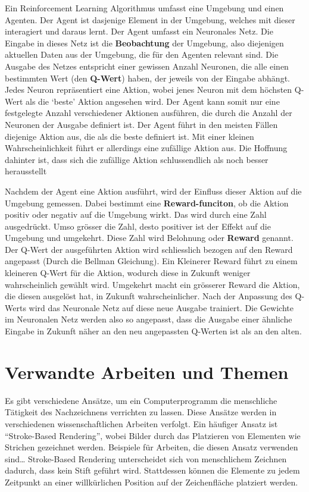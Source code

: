 Ein Reinforcement Learning Algorithmus umfasst eine Umgebung und einen Agenten.
Der Agent ist dasjenige Element in der Umgebung, welches mit dieser interagiert
und daraus lernt. Der Agent umfasst ein Neuronales Netz. Die Eingabe in dieses
Netz ist die \textbf{Beobachtung} der Umgebung, also diejenigen aktuellen Daten
aus der Umgebung, die für den Agenten relevant sind. Die Ausgabe des Netzes
entspricht einer gewissen Anzahl Neuronen, die alle einen bestimmten Wert (den
\textbf{Q-Wert}) haben, der jeweils von der Eingabe abhängt. Jedes Neuron
repräsentiert eine Aktion, wobei jenes Neuron mit dem höchsten Q-Wert als die
`beste' Aktion angesehen wird. Der Agent kann somit nur eine festgelegte Anzahl
verschiedener Aktionen ausführen, die durch die Anzahl der Neuronen der Ausgabe
definiert ist. Der Agent führt in den meisten Fällen diejenige Aktion aus, die
als die beste definiert ist. Mit einer kleinen Wahrscheinlichkeit führt er
allerdings eine zufällige Aktion aus. Die Hoffnung dahinter ist, dass sich die
zufällige Aktion schlussendlich als noch besser herausstellt 

Nachdem der Agent eine Aktion ausführt, wird der Einfluss dieser Aktion auf die
Umgebung gemessen. Dabei bestimmt eine \textbf{Reward-funciton}, ob die Aktion
positiv oder negativ auf die Umgebung wirkt. Das wird durch eine Zahl
ausgedrückt. Umso grösser die Zahl, desto positiver ist der Effekt auf die
Umgebung und umgekehrt. Diese Zahl wird Belohnung oder \textbf{Reward} genannt.
Der Q-Wert der ausgeführten Aktion wird schliesslich bezogen auf den Reward
angepasst (Durch die Bellman Gleichung). Ein Kleinerer Reward führt zu einem
kleineren Q-Wert für die Aktion, wodurch diese in Zukunft weniger wahrscheinlich
gewählt wird. Umgekehrt macht ein grösserer Reward die Aktion, die diesen
ausgelöst hat, in Zukunft wahrscheinlicher. Nach der Anpassung des Q-Werts wird
das Neuronale Netz auf diese neue Ausgabe trainiert. Die Gewichte im Neuronalen
Netz werden also so angepasst, dass die Ausgabe einer ähnliche Eingabe in
Zukunft näher an den neu angepassten Q-Werten ist als an den alten.


\section{Verwandte Arbeiten und Themen}
\label{chap:t_verwandt}
Es gibt verschiedene Ansätze, um ein Computerprogramm die menschliche Tätigkeit
des Nachzeichnens verrichten zu lassen. Diese Ansätze werden in verschiedenen
wissenschaftlichen Arbeiten verfolgt. Ein häufiger Ansatz ist ``Stroke-Based
Rendering'', wobei Bilder durch das Platzieren von Elementen wie Strichen
gezeichnet werden. Beispiele für Arbeiten, die diesen Ansatz verwenden sind\dots %
Stroke-Based Rendering unterscheidet sich von menschlichem Zeichnen dadurch,
dass kein Stift geführt wird. Stattdessen können die Elemente zu jedem Zeitpunkt
an einer willkürlichen Position auf der Zeichenfläche platziert werden.

